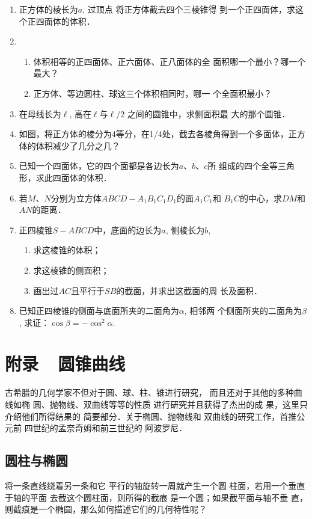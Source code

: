 \begin{enumerate}
\item 正方体的棱长为$a$, 过顶点
将正方体截去四个三棱锥得
到一个正四面体，求这个正四面体的体积．
\item \begin{enumerate}
    \item 体积相等的正四面体、正六面体、正八面体的全
    面积哪一个最小？哪一个最大？
    \item 正方体、等边圆柱、球这三个体积相同时，哪一
    个全面积最小？
\end{enumerate}
\item 在母线长为$\ell$, 高在$\ell$与$\ell/2$
之间的圆锥中，求侧面积最
大的那个圆锥．
\item 如图，将正方体的棱分为4等分，在1/4处，截去各棱角得到一个多面体，正方体的体积减少了几分之几？
\item 已知一个四面体，它的四个面都是各边长为$a$、$b$、$c$所
组成的四个全等三角形，求此四面体的体积．
\item 若$M$、$N$分别为立方体$ABCD-A_1B_1C_1D_1$的面$A_1C_1$和
$B_1C$的中心，求$DM$和$AN$的距离．
\item 正四棱锥$S-ABCD$中，底面的边长为$a$, 侧棱长为$b$,
\begin{enumerate}
    \item 求这棱锥的体积；
    \item 求这棱锥的侧面积；
    \item 画出过$AC$且平行于$SB$的截面，并求出这截面的周
长及面积．
\end{enumerate}

\item 已知正四棱锥的侧面与底面所夹的二面角为$\alpha$, 相邻两
个侧面所夹的二面角为$\beta$, 求证：$\cos\beta=-\cos^2\alpha$.
\end{enumerate}

\section{附录~~圆锥曲线}
古希腊的几何学家不但对于圆、球、柱、锥进行研究，
而且还对于其他的多种曲线如椭
圆、抛物线、双曲线等等的性质
进行研究并且获得了杰出的成
果，这里只介绍他们所得结果的
简要部分．关于椭圆、抛物线和
双曲线的研究工作，首推公元前
四世纪的孟奈奇姆和前三世纪的
阿波罗尼．

\subsection{圆柱与椭圆}
将一条直线绕着另一条和它
平行的轴旋转一周就产生一个圆
柱面，若用一个垂直于轴的平面
去截这个圆柱面，则所得的截痕
是一个圆；如果截平面与轴不垂
直，则截痕是一个椭圆，那么如何描述它们的几何特性呢？

